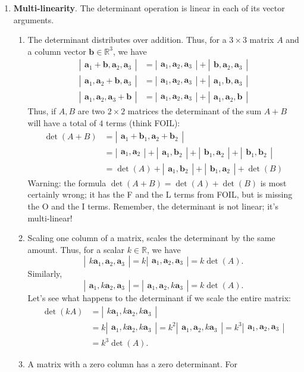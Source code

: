 \documentclass[12pt]{article}
\newcommand{\ba}{\mathbf{a}}
\newcommand{\bb}{\mathbf{b}}
\newcommand{\R}{\mathbb{R}}
\newcommand{\vmat}[1]{\left|\begin{matrix}#1\end{matrix}\right|}
\begin{document}
\begin{enumerate}
\item \textbf{Multi-linearity}.  The determinant operation is linear
  in each of its vector arguments.
  \begin{enumerate}
  \item The determinant distributes over addition.  Thus, for a
    $3\times 3$ matrix $A$ and a column vector $\bb\in \R^3$, we have
    \begin{align*}
      \vmat{\ba_1 + \bb , \ba_2, \ba_3} &= \vmat{\ba_1,\ba_2,\ba_3} +
      \vmat{\bb,\ba_2,\ba_3} \\
      \vmat{\ba_1 , \ba_2 + \bb, \ba_3} &= \vmat{\ba_1,\ba_2,\ba_3} +
      \vmat{\ba_1,\bb,\ba_3} \\
      \vmat{\ba_1 , \ba_2, \ba_3 + \bb} &= \vmat{\ba_1,\ba_2,\ba_3} +
      \vmat{\ba_1,\ba_2,\bb}     
    \end{align*}
    Thus, if $A,B$ are two $2\times 2$ matrices the determinant of the
    sum $A+B$ will have a total of $4$ terms (think FOIL):
    \begin{align*}
      \det(A+B) &= \vmat{\ba_1+\bb_1, \ba_2+\bb_2} \\
      &= \vmat{\ba_1, \ba_2} + \vmat{\ba_1, \bb_2} +
      \vmat{\bb_1,\ba_2}+\vmat{\bb_1, \bb_2}\\
      &= \det(A) + \vmat{\ba_1, \bb_2} +
      \vmat{\bb_1,\ba_2}+\det(B)
    \end{align*}
    Warning: the formula $\det(A+B)=\det(A)+\det(B)$ is most certainly
    wrong; it has the F and the L terms from FOIL, but is missing the
    O and the I terms.  Remember, the determinant is not linear; it's
    multi-linear!
  \item Scaling one column of a matrix, scales the determinant by the
    same amount.  Thus, for a scalar $k\in \R$, we have
    \[ \vmat{k \ba_1, \ba_2, \ba_3} = k \vmat{\ba_1,\ba_2, \ba_3} =
    k\det(A).\]
    Similarly,
    \[ \vmat{\ba_1, k\ba_2, \ba_3} = \vmat{\ba_1,\ba_2, k \ba_3} = k
    \det(A). \]
    Let's see what happens to the determinant if we scale the entire
    matrix:
    \begin{align*}
      \det(kA ) &= \vmat{k\ba_1, k\ba_2, k\ba_3} \\
      &= k \vmat{\ba_1, k
      \ba_2, k \ba_3}= k^2 \vmat{\ba_1, \ba_2, k \ba_3}= k^3
    \vmat{\ba_1, \ba_2, \ba_3} \\&= k^3 \det(A).      
    \end{align*}
  \item A matrix with a zero column has a zero determinant.  For

\end{enumerate}
\end{enumerate}
\end{document}
